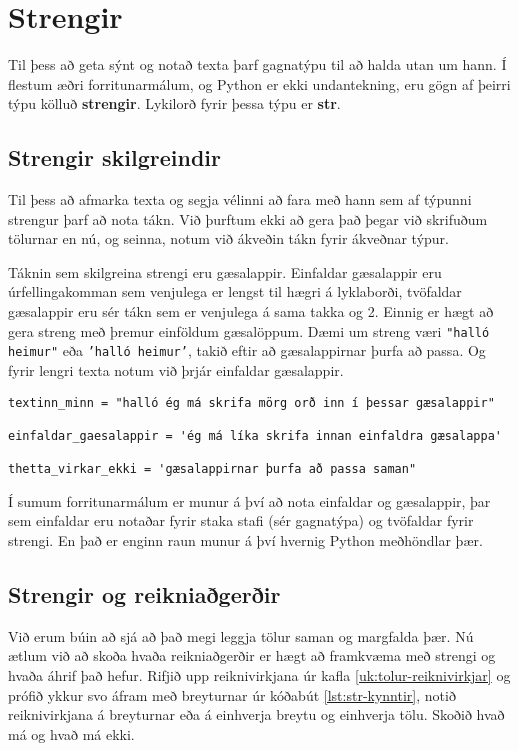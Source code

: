\chapter{Strengir}\label{k:strengir}
Til þess að geta sýnt og notað texta þarf gagnatýpu til að halda utan um hann.
Í flestum æðri forritunarmálum, og Python er ekki undantekning, eru gögn af þeirri týpu kölluð \textbf{strengir}.
Lykilorð fyrir þessa týpu er \textbf{str}.

\section{Strengir skilgreindir}
Til þess að afmarka texta og segja vélinni að fara með hann sem af týpunni strengur þarf að nota tákn.
Við þurftum ekki að gera það þegar við skrifuðum tölurnar en nú, og seinna, notum við ákveðin tákn fyrir ákveðnar týpur.

Táknin sem skilgreina strengi eru gæsalappir.
Einfaldar gæsalappir eru úrfellingakomman sem venjulega er lengst til hægri á lyklaborði, tvöfaldar gæsalappir eru sér tákn sem er venjulega á sama takka og 2.
Einnig er hægt að gera streng með þremur einföldum gæsalöppum.
Dæmi um streng væri \texttt{"halló heimur"} eða \texttt{'halló heimur'}, takið eftir að gæsalappirnar þurfa að passa.
Og fyrir lengri texta notum við þrjár einfaldar gæsalappir.

\begin{lstlisting}[caption=Strengir skilgreindir, label=lst:str-kynntir]
textinn_minn = "halló ég má skrifa mörg orð inn í þessar gæsalappir"

einfaldar_gaesalappir = 'ég má líka skrifa innan einfaldra gæsalappa'

thetta_virkar_ekki = 'gæsalappirnar þurfa að passa saman" 
\end{lstlisting}

Í sumum forritunarmálum er munur á því að nota einfaldar og gæsalappir, þar sem einfaldar eru notaðar fyrir staka stafi (sér gagnatýpa) og tvöfaldar fyrir strengi.
En það er enginn raun munur á því hvernig Python meðhöndlar þær.

\section{Strengir og reikniaðgerðir}
Við erum búin að sjá að það megi leggja tölur saman og margfalda þær.
Nú ætlum við að skoða hvaða reikniaðgerðir er hægt að framkvæma með strengi og hvaða áhrif það hefur.
Rifjið upp reiknivirkjana úr kafla \ref{uk:tolur-reiknivirkjar} og prófið ykkur svo áfram með breyturnar úr kóðabút \ref{lst:str-kynntir}, notið reiknivirkjana á breyturnar eða á einhverja breytu og einhverja tölu.
Skoðið hvað má og hvað má ekki.

